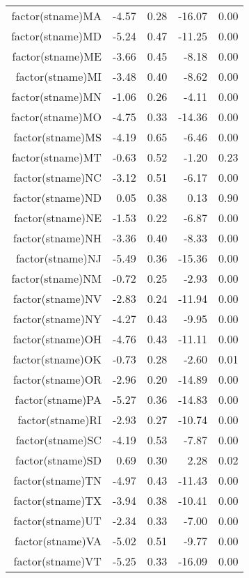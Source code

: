 \begin{table}[ht]
\begin{tabular}{rrrrr}
  factor(stname)MA & -4.57 & 0.28 & -16.07 & 0.00 \\ 
  factor(stname)MD & -5.24 & 0.47 & -11.25 & 0.00 \\ 
  factor(stname)ME & -3.66 & 0.45 & -8.18 & 0.00 \\ 
  factor(stname)MI & -3.48 & 0.40 & -8.62 & 0.00 \\ 
  factor(stname)MN & -1.06 & 0.26 & -4.11 & 0.00 \\ 
  factor(stname)MO & -4.75 & 0.33 & -14.36 & 0.00 \\ 
  factor(stname)MS & -4.19 & 0.65 & -6.46 & 0.00 \\ 
  factor(stname)MT & -0.63 & 0.52 & -1.20 & 0.23 \\ 
  factor(stname)NC & -3.12 & 0.51 & -6.17 & 0.00 \\ 
  factor(stname)ND & 0.05 & 0.38 & 0.13 & 0.90 \\ 
  factor(stname)NE & -1.53 & 0.22 & -6.87 & 0.00 \\ 
  factor(stname)NH & -3.36 & 0.40 & -8.33 & 0.00 \\ 
  factor(stname)NJ & -5.49 & 0.36 & -15.36 & 0.00 \\ 
  factor(stname)NM & -0.72 & 0.25 & -2.93 & 0.00 \\ 
  factor(stname)NV & -2.83 & 0.24 & -11.94 & 0.00 \\ 
  factor(stname)NY & -4.27 & 0.43 & -9.95 & 0.00 \\ 
  factor(stname)OH & -4.76 & 0.43 & -11.11 & 0.00 \\ 
  factor(stname)OK & -0.73 & 0.28 & -2.60 & 0.01 \\ 
  factor(stname)OR & -2.96 & 0.20 & -14.89 & 0.00 \\ 
  factor(stname)PA & -5.27 & 0.36 & -14.83 & 0.00 \\ 
  factor(stname)RI & -2.93 & 0.27 & -10.74 & 0.00 \\ 
  factor(stname)SC & -4.19 & 0.53 & -7.87 & 0.00 \\ 
  factor(stname)SD & 0.69 & 0.30 & 2.28 & 0.02 \\ 
  factor(stname)TN & -4.97 & 0.43 & -11.43 & 0.00 \\ 
  factor(stname)TX & -3.94 & 0.38 & -10.41 & 0.00 \\ 
  factor(stname)UT & -2.34 & 0.33 & -7.00 & 0.00 \\ 
  factor(stname)VA & -5.02 & 0.51 & -9.77 & 0.00 \\ 
  factor(stname)VT & -5.25 & 0.33 & -16.09 & 0.00 \\ 

\end{tabular}
\end{table}
